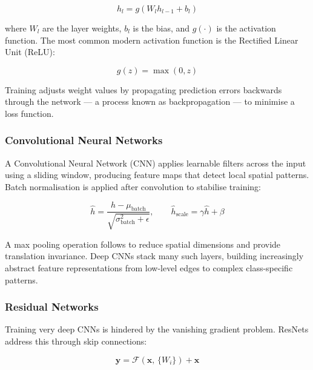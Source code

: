 \documentclass[12pt, letterpaper]{article}
\begin{document}
\begin{equation}
    h_l = g(W_l h_{l-1} + b_l)
    \label{eq:neuron}
\end{equation}

where $W_l$ are the layer weights, $b_l$ is the bias, and $g(\cdot)$ is the activation
function. The most common modern activation function is the Rectified Linear Unit (ReLU):

\begin{equation}
    g(z) = \max(0, z)
    \label{eq:relu}
\end{equation}

Training adjusts weight values by propagating prediction errors backwards through the
network --- a process known as backpropagation --- to minimise a loss function.

\subsubsection{Convolutional Neural Networks}

A Convolutional Neural Network (CNN) applies learnable filters across the input using
a sliding window, producing feature maps that detect local spatial patterns. Batch
normalisation \cite{ioffe2015batch} is applied after convolution to stabilise training:

\begin{equation}
    \hat{h} = \frac{h - \mu_{\text{batch}}}{\sqrt{\sigma_{\text{batch}}^2 + \epsilon}},
    \qquad
    \hat{h}_{\text{scale}} = \gamma \hat{h} + \beta
    \label{eq:bn}
\end{equation}

A max pooling operation follows to reduce spatial dimensions and provide translation
invariance. Deep CNNs stack many such layers, building increasingly abstract feature
representations from low-level edges to complex class-specific patterns.

\subsubsection{Residual Networks}

Training very deep CNNs is hindered by the vanishing gradient problem. ResNets
\cite{he2016resnet} address this through skip connections:

\begin{equation}
    \mathbf{y} = \mathcal{F}(\mathbf{x},\, \{W_i\}) + \mathbf{x}
    \label{eq:resnet}
\end{equation}
\end{document}
